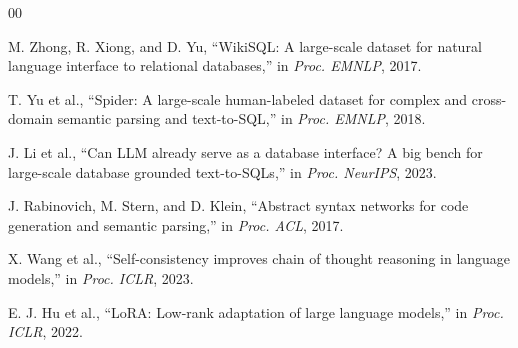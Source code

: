 \documentclass[conference]{IEEEtran}
\begin{document}
\begin{thebibliography}{00}

M. Zhong, R. Xiong, and D. Yu, ``WikiSQL: A large-scale dataset for natural language interface to relational databases,'' in \textit{Proc. EMNLP}, 2017.

T. Yu et al., ``Spider: A large-scale human-labeled dataset for complex and cross-domain semantic parsing and text-to-SQL,'' in \textit{Proc. EMNLP}, 2018.

J. Li et al., ``Can LLM already serve as a database interface? A big bench for large-scale database grounded text-to-SQLs,'' in \textit{Proc. NeurIPS}, 2023.

J. Rabinovich, M. Stern, and D. Klein, ``Abstract syntax networks for code generation and semantic parsing,'' in \textit{Proc. ACL}, 2017.

X. Wang et al., ``Self-consistency improves chain of thought reasoning in language models,'' in \textit{Proc. ICLR}, 2023.

E. J. Hu et al., ``LoRA: Low-rank adaptation of large language models,'' in \textit{Proc. ICLR}, 2022.

\end{thebibliography}
\end{document}
